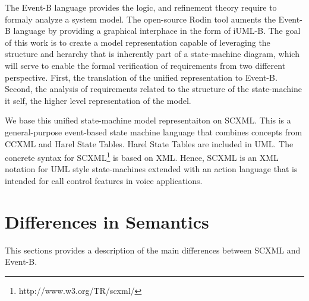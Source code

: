 \documentclass{easychair}
\begin{document}
The Event-B language provides the logic, and refinement
theory require to formaly analyze a system model. The 
open-source Rodin tool auments the Event-B language by 
providing a graphical interphace in the form of
iUML-B. The goal of this work is to create a model 
representation capable of leveraging the structure and 
herarchy that is inherently part of a state-machine 
diagram, which will serve to enable the formal verification
of requirements from two different  perspective. First, 
the translation of the unified representation to Event-B. Second,
the analysis of requirements related to the structure of 
the state-machine it self, the higher level representation 
of the model. 

We base this unified state-machine model representaiton 
on SCXML.  This is a general-purpose event-based state machine 
language that combines concepts from CCXML and Harel 
State Tables. Harel State Tables are included in UML. 
The concrete syntax for SCXML\footnote{http://www.w3.org/TR/scxml/} 
is based on XML. Hence, SCXML is an XML notation for 
UML style state-machines extended with an action 
language that is intended for call control features 
in voice applications.


\section{Differences in Semantics}
\label{sect:diff}




This sections provides a description of the main differences 
between SCXML and Event-B. 
\end{document}
